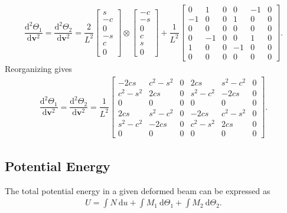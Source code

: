 \documentclass[11pt]{article}
\begin{document}
\begin{gather}
\dfrac{\mathrm{d}^2\Theta_1}{\mathrm{d}\mathbf{v}^2}=\dfrac{\mathrm{d}^2\Theta_2}{\mathrm{d}\mathbf{v}^2}=\dfrac{2}{L^2}\begin{bmatrix}
s\\-c\\0\\-s\\c\\0
\end{bmatrix}\otimes\begin{bmatrix}
-c\\-s\\0\\c\\s\\0
\end{bmatrix}+
\dfrac{1}{L^2}\begin{bmatrix}
	0  & 1  & 0 & 0  & -1 & 0 \\
	-1 & 0  & 0 & 1  & 0  & 0 \\
	0  & 0  & 0 & 0  & 0  & 0 \\
	0  & -1 & 0 & 0  & 1  & 0 \\
	1  & 0  & 0 & -1 & 0  & 0 \\
	0  & 0  & 0 & 0  & 0  & 0
\end{bmatrix}.
\end{gather}
Reorganizing gives
\begin{gather}
\dfrac{\mathrm{d}^2\Theta_1}{\mathrm{d}\mathbf{v}^2}=\dfrac{\mathrm{d}^2\Theta_2}{\mathrm{d}\mathbf{v}^2}=\dfrac{1}{L^2}\begin{bmatrix}
	-2cs      & c^2 - s^2 & 0 & 2cs       & s^2 - c^2 & 0 \\
	c^2 - s^2 & 2cs       & 0 & s^2 - c^2 & -2cs      & 0 \\
	0         & 0         & 0 & 0         & 0         & 0 \\
	2cs       & s^2 - c^2 & 0 & -2cs      & c^2 - s^2 & 0 \\
	s^2 - c^2 & -2cs      & 0 & c^2 - s^2 & 2cs       & 0 \\
	0         & 0         & 0 & 0         & 0         & 0
\end{bmatrix}.
\end{gather} 
\subsection{Potential Energy}
The total potential energy in a given deformed beam can be expressed as
\begin{gather}
U=\int{}N~\mathrm{d}u+\int{}M_1~\mathrm{d}\Theta_1+\int{}M_2~\mathrm{d}\Theta_2.
\end{gather}
\end{document}
